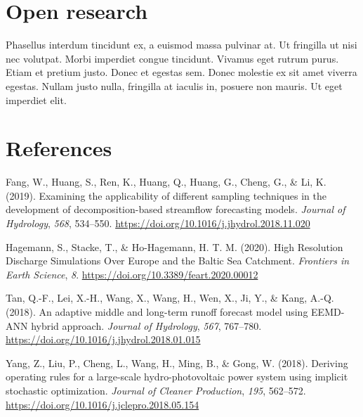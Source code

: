 \documentclass[
]{agujournal2019}
\newlength{\cslhangindent}
\newlength{\cslentryspacingunit} %
\newenvironment{CSLReferences}[2] %
 {%
  \setlength{\parindent}{0pt}
  \ifodd #1
  \let\oldpar\par
  \def\par{\hangindent=\cslhangindent\oldpar}
  \fi
  \setlength{\parskip}{#2\cslentryspacingunit}
 }%
 {}
\begin{document}
\hypertarget{open-research}{%
\section{Open research}\label{open-research}}

Phasellus interdum tincidunt ex, a euismod massa pulvinar at. Ut
fringilla ut nisi nec volutpat. Morbi imperdiet congue tincidunt.
Vivamus eget rutrum purus. Etiam et pretium justo. Donec et egestas sem.
Donec molestie ex sit amet viverra egestas. Nullam justo nulla,
fringilla at iaculis in, posuere non mauris. Ut eget imperdiet elit.

\hypertarget{references}{%
\section*{References}\label{references}}

\hypertarget{refs}{}
\begin{CSLReferences}{1}{0}
\vspace{1em}

\leavevmode{}%
Fang, W., Huang, S., Ren, K., Huang, Q., Huang, G., Cheng, G., \& Li, K.
(2019). Examining the applicability of different sampling techniques in
the development of decomposition-based streamflow forecasting models.
\emph{Journal of Hydrology}, \emph{568}, 534--550.
\url{https://doi.org/10.1016/j.jhydrol.2018.11.020}

\leavevmode{}%
Hagemann, S., Stacke, T., \& Ho-Hagemann, H. T. M. (2020). High
{Resolution Discharge Simulations Over Europe} and the {Baltic Sea
Catchment}. \emph{Frontiers in Earth Science}, \emph{8}.
\url{https://doi.org/10.3389/feart.2020.00012}

\leavevmode{}%
Tan, Q.-F., Lei, X.-H., Wang, X., Wang, H., Wen, X., Ji, Y., \& Kang,
A.-Q. (2018). An adaptive middle and long-term runoff forecast model
using {EEMD-ANN} hybrid approach. \emph{Journal of Hydrology},
\emph{567}, 767--780.
\url{https://doi.org/10.1016/j.jhydrol.2018.01.015}

\leavevmode{}%
Yang, Z., Liu, P., Cheng, L., Wang, H., Ming, B., \& Gong, W. (2018).
Deriving operating rules for a large-scale hydro-photovoltaic power
system using implicit stochastic optimization. \emph{Journal of Cleaner
Production}, \emph{195}, 562--572.
\url{https://doi.org/10.1016/j.jclepro.2018.05.154}

\end{CSLReferences}
\end{document}
